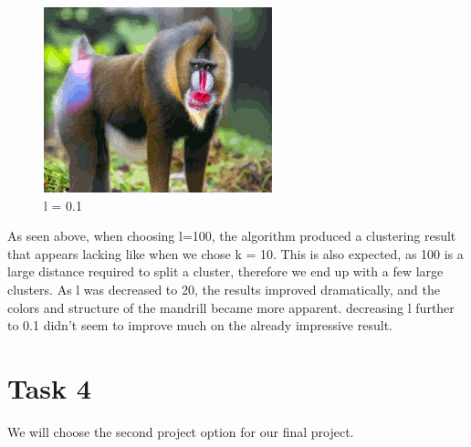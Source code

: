 \documentclass[12pt]{article}
\begin{document}
\begin{figure}[!h]
        \begin{minipage}{0.5\textwidth}
        \centering
        \includegraphics[]{images/monkey_clustered_pdc_dp_means_l_0.1}
        \caption{l = 0.1}
        \end{minipage}\label{fig:figure8}
	\end{figure}
    As seen above, when choosing l=100, the algorithm produced a clustering result that appears lacking like when we chose k = 10.
    This is also expected, as 100 is a large distance required to split a cluster, therefore we end up with a few large clusters.
    As l was decreased to 20, the results improved dramatically, and the colors and structure of the mandrill became more apparent.
    decreasing l further to 0.1 didn't seem to improve much on the already impressive result.

    \section*{Task 4}\label{sec:task-4}
    We will choose the second project option for our final project.
\end{document}

